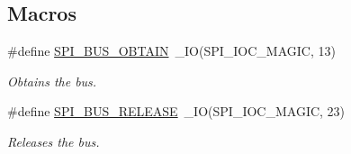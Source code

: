 \subsection*{Macros}
\begin{DoxyCompactItemize}
\item 
\#define \mbox{\hyperlink{group__SPI_gacb010bcbdaab298a6893c06fbaff590c}{S\+P\+I\+\_\+\+B\+U\+S\+\_\+\+O\+B\+T\+A\+IN}}~\+\_\+\+IO(S\+P\+I\+\_\+\+I\+O\+C\+\_\+\+M\+A\+G\+IC, 13)
\begin{DoxyCompactList}\small\item\em Obtains the bus. \end{DoxyCompactList}\item 
\#define \mbox{\hyperlink{group__SPI_ga7feb36e9867e404a0af9a15e68fef122}{S\+P\+I\+\_\+\+B\+U\+S\+\_\+\+R\+E\+L\+E\+A\+SE}}~\+\_\+\+IO(S\+P\+I\+\_\+\+I\+O\+C\+\_\+\+M\+A\+G\+IC, 23)
\begin{DoxyCompactList}\small\item\em Releases the bus. \end{DoxyCompactList}\end{DoxyCompactItemize}
